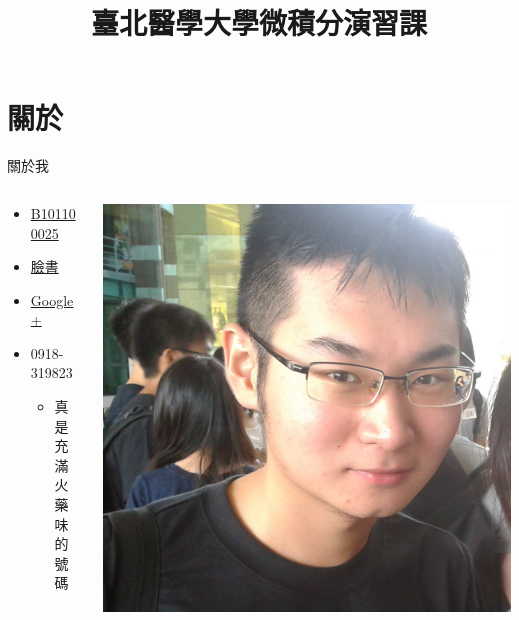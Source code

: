\documentclass{Slideshow}
\begin{document}
\title[微積分演習課]{臺北醫學大學微積分演習課}
\maketitle

\section{關於}
\begin{frame}{關於我}
    \begin{columns}[onlytextwidth]
        \begin{column}{0.6\textwidth}
            \begin{itemize}
                \item \href{http://my2.tmu.edu.tw/b101100025}{B101100025}
                \item \href{https://www.facebook.com/jdh863}{臉書}
                \item \href{https://plus.google.com/+\%E4\%BD\%95\%E9\%9C\%87\%E9\%82\%A6-jdh8}{Google+}
                \item 0918-319823
                    \begin{itemize}
                        \item 真是充滿火藥味的號碼
                    \end{itemize}
            \end{itemize}
        \end{column}

        \begin{column}{0.4\textwidth}
            \begin{flushleft}
                \newlength{\stickerwidth}
                \setlength{\stickerwidth}{\columnwidth - 1em}
                \includegraphics[width=\stickerwidth]{Introduction/sticker.jpg}
            \end{flushleft}
        \end{column}
    \end{columns}
\end{frame}
\end{document}
